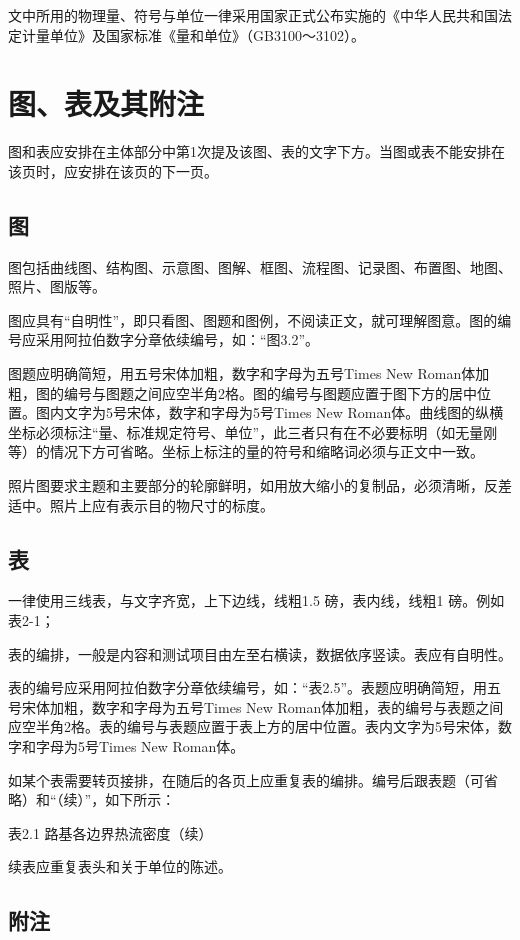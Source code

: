 文中所用的物理量、符号与单位一律采用国家正式公布实施的《中华人民共和国法定计量单位》及国家标准《量和单位》（GB3100～3102）。

\section{图、表及其附注}

图和表应安排在主体部分中第1次提及该图、表的文字下方。当图或表不能安排在该页时，应安排在该页的下一页。

\subsection{图}

图包括曲线图、结构图、示意图、图解、框图、流程图、记录图、布置图、地图、照片、图版等。

图应具有“自明性”，即只看图、图题和图例，不阅读正文，就可理解图意。图的编号应采用阿拉伯数字分章依续编号，如：“图3.2”。

图题应明确简短，用五号宋体加粗，数字和字母为五号Times New Roman体加粗，图的编号与图题之间应空半角2格。图的编号与图题应置于图下方的居中位置。图内文字为5号宋体，数字和字母为5号Times New Roman体。曲线图的纵横坐标必须标注“量、标准规定符号、单位”，此三者只有在不必要标明（如无量刚等）的情况下方可省略。坐标上标注的量的符号和缩略词必须与正文中一致。

照片图要求主题和主要部分的轮廓鲜明，如用放大缩小的复制品，必须清晰，反差适中。照片上应有表示目的物尺寸的标度。

\subsection{表}

一律使用三线表，与文字齐宽，上下边线，线粗1.5 磅，表内线，线粗1 磅。例如表2-1；

表的编排，一般是内容和测试项目由左至右横读，数据依序竖读。表应有自明性。

表的编号应采用阿拉伯数字分章依续编号，如：“表2.5”。表题应明确简短，用五号宋体加粗，数字和字母为五号Times New Roman体加粗，表的编号与表题之间应空半角2格。表的编号与表题应置于表上方的居中位置。表内文字为5号宋体，数字和字母为5号Times New Roman体。

如某个表需要转页接排，在随后的各页上应重复表的编排。编号后跟表题（可省略）和“（续）”，如下所示：

表2.1  路基各边界热流密度（续）

续表应重复表头和关于单位的陈述。

\subsection{附注}

